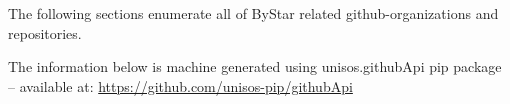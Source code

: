 The following sections enumerate all of ByStar related
github-organizations and repositories.

The information below is machine generated using 
unisos.githubApi pip package -- available at: \url{https://github.com/unisos-pip/githubApi}

\begin{comment}
*  [[elisp:(org-cycle)][| ]]  [[elisp:(blee:ppmm:org-mode-toggle)][Nat]] [[elisp:(beginning-of-buffer)][Top]] [[elisp:(delete-other-windows)][(1)]] || /Input/  [[elisp:(blee:file-goto-contents "./githubReport.tex")][Goto ./githubReport.tex]] ::  [[elisp:(org-cycle)][| ]]
\end{comment}






\begin{comment}
*  [[elisp:(org-cycle)][| ]]  Local Vars  ::                  *Org-Mode And Emacs Specific Configurations*   [[elisp:(org-cycle)][| ]]
\end{comment}


\begin{comment}
*  [[elisp:(org-cycle)][| ]]  [[elisp:(blee:ppmm:org-mode-toggle)][Nat]] EndOfFileVars ::  *DBLK: Org-Mode And Emacs Specific Configurations*   [[elisp:(org-cycle)][| ]]
\end{comment}


